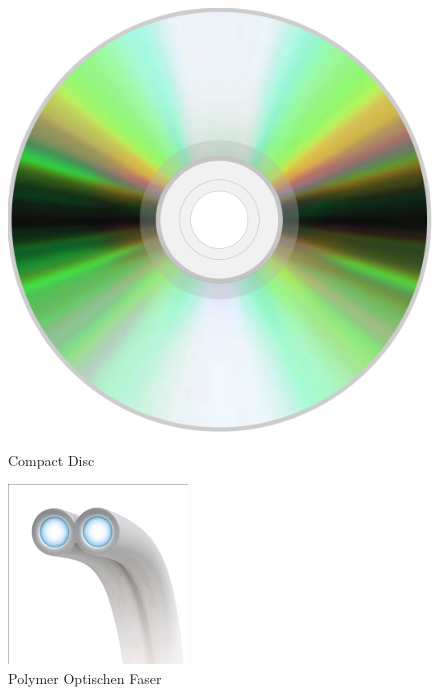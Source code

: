 \begin{figure}[h]
    \begin{center}
        \begin{minipage}[t]{0.3\textwidth}
            \begin{center}
                \includegraphics[height=0.1\textheight]{Bilder/Einleitung/compact-disk.png}
                \caption[Compact Disc \newline \url{https://en.wikipedia.org/wiki/File:Compact_disc.svg} (zuletzt aufgerufen am 19.09.2015)]{Compact Disc}
                \label{fig:compact-disc}
            \end{center}
        \end{minipage}
        \hspace{0.025\textwidth}
        \begin{minipage}[t]{0.3\textwidth}
            \begin{center}
                \includegraphics[height=0.1\textheight]{Bilder/Einleitung/pof.png}
                \caption[Polymer Optischen Faser \newline \url{http://www.heise.de/tr/imgs/08/2/5/4/2/1/5/c337ef89957e0f2b.jpg} (zuletzt aufgerufen am 19.09.2015)]{Polymer Optischen Faser}
                \label{fig:pof}
            \end{center}
        \end{minipage}
    \end{center}
\end{figure}
